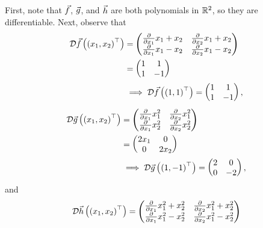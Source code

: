 \documentclass[main.tex]{subfiles}
\begin{document}
\begin{soln}
    First, note that $\vec{f}$, $\vec{g}$, and $\vec{h}$ are both polynomials in $\mathbb R^2$, so they are differentiable. Next, observe that
    \begin{align*}
        \mathcal{D}\vec{f}\left( \left( x_1, x_2 \right)^\top \right) &= \begin{pmatrix}
            \pdv{}{x_1} x_1 + x_2 & \pdv{}{x_2} x_1 + x_2 \\
            \pdv{}{x_1} x_1 - x_2 & \pdv{}{x_2} x_1 - x_2
        \end{pmatrix} \\
         &= \begin{pmatrix}
            1 & 1 \\
            1 & -1
        \end{pmatrix} \\
        &\implies \mathcal{D}\vec{f}\left( \left( 1, 1 \right)^\top \right) = \begin{pmatrix}
            1 & 1 \\
            1 & -1
        \end{pmatrix},
    \end{align*}
    \begin{align*}
        \mathcal{D}\vec{g}\left( \left( x_1, x_2 \right)^\top \right) &= \begin{pmatrix}
            \pdv{}{x_1} x_1^2 & \pdv{}{x_2} x_1^2 \\
            \pdv{}{x_1} x_2^2 & \pdv{}{x_2} x_2^2
        \end{pmatrix} \\
         &= \begin{pmatrix}
            2x_1 & 0 \\
            0 & 2x_2
        \end{pmatrix} \\
        &\implies \mathcal{D}\vec{g}\left( \left( 1, -1 \right)^\top \right) = \begin{pmatrix}
            2 & 0 \\
            0 & -2
        \end{pmatrix},
    \end{align*}
    and
    \begin{align*}
        \mathcal{D}\vh\parens{\parens{x_1, x_2}^\top} &= \begin{pmatrix}
            \pdv{}{x_1} x_1^2 + x_2^2 & \pdv{}{x_2} x_1^2 + x_2^2 \\
            \pdv{}{x_1} x_1^2 - x_2^2 & \pdv{}{x_2} x_1^2 - x_2^2
        \end{pmatrix} \\

\end{align*}
\end{soln}
\end{document}

